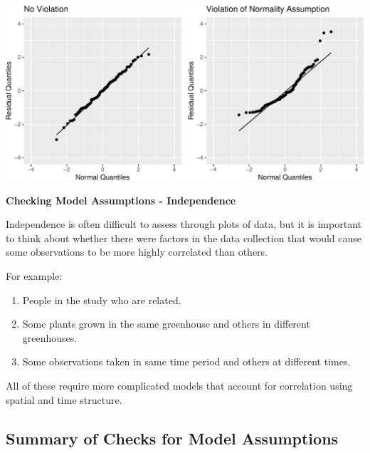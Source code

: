 \documentclass[
  letterpaper,
  DIV=11,
  numbers=noendperiod]{scrreprt}
\providecommand{\tightlist}{%
  \setlength{\itemsep}{0pt}\setlength{\parskip}{0pt}}\usepackage{longtable,booktabs,array}
\begin{document}
\includegraphics{Ch5_files/figure-pdf/unnamed-chunk-7-1.pdf}

\textbf{Checking Model Assumptions - Independence}

Independence is often difficult to assess through plots of data, but it
is important to think about whether there were factors in the data
collection that would cause some observations to be more highly
correlated than others.

For example:

\begin{enumerate}
\def\labelenumi{\arabic{enumi}.}
\tightlist
\item
  People in the study who are related.\\
\item
  Some plants grown in the same greenhouse and others in different
  greenhouses.\\
\item
  Some observations taken in same time period and others at different
  times.
\end{enumerate}

All of these require more complicated models that account for
correlation using spatial and time structure.

\subsection{Summary of Checks for Model
Assumptions}\label{summary-of-checks-for-model-assumptions}
\end{document}
